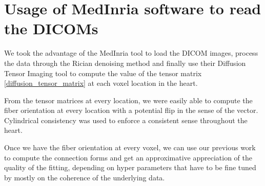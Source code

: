 \section{Usage of MedInria software to read the DICOMs}

We took the advantage of the MedInria tool to load the DICOM images, process the data through the Rician denoising method and finally use their Diffusion Tensor Imaging tool to compute the value of the tensor matrix \ref{diffusion_tensor_matrix} at each voxel location in the heart.

From the tensor matrices at every location, we were easily able to compute the fiber orientation at every location with a potential flip in the sense of the vector. Cylindrical consistency was used to enforce a consistent sense throughout the heart.

Once we have the fiber orientation at every voxel, we can use our previous work to compute the connection forms and get an approximative appreciation of the quality of the fitting, depending on hyper parameters that have to be fine tuned by mostly on the coherence of the underlying data.